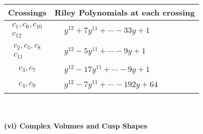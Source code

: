 \documentclass[1p]{elsarticle_modified}
\theoremstyle{definition}
\begin{document}
\begin{tabular}{m{50pt}|m{274pt}}
Crossings & \hspace{64pt}Riley Polynomials at each crossing \\
\hline $$\begin{aligned}c_{1},c_{6},c_{10}\\c_{12}\end{aligned}$$&$\begin{aligned}
&y^{12}+7 y^{11}+\cdots-33 y+1
\end{aligned}$\\
\hline $$\begin{aligned}c_{2},c_{5},c_{8}\\c_{11}\end{aligned}$$&$\begin{aligned}
&y^{12}-5 y^{11}+\cdots-9 y+1
\end{aligned}$\\
\hline $$\begin{aligned}c_{3},c_{7}\end{aligned}$$&$\begin{aligned}
&y^{12}-17 y^{11}+\cdots-9 y+1
\end{aligned}$\\
\hline $$\begin{aligned}c_{4},c_{9}\end{aligned}$$&$\begin{aligned}
&y^{12}-7 y^{11}+\cdots-192 y+64
\end{aligned}$\\
\hline
\end{tabular}\\~\\
\newpage\flushleft \textbf{(vi) Complex Volumes and Cusp Shapes}
\end{document}
